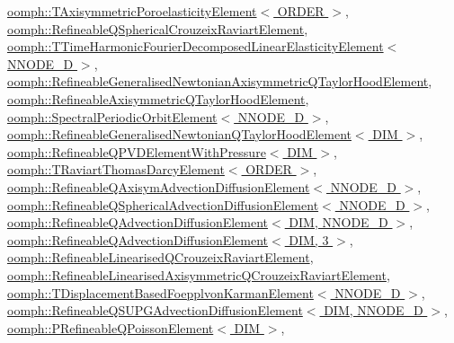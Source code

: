 \hyperlink{classoomph_1_1TAxisymmetricPoroelasticityElement_a0ca2892eb086103a351bcd202f10f98d}{oomph\+::\+T\+Axisymmetric\+Poroelasticity\+Element$<$ O\+R\+D\+E\+R $>$}, \hyperlink{classoomph_1_1RefineableQSphericalCrouzeixRaviartElement_a9784f4a6c9cc49169b0089b85373c434}{oomph\+::\+Refineable\+Q\+Spherical\+Crouzeix\+Raviart\+Element}, \hyperlink{classoomph_1_1TTimeHarmonicFourierDecomposedLinearElasticityElement_a57870ab2c9c506070441d8a428820d27}{oomph\+::\+T\+Time\+Harmonic\+Fourier\+Decomposed\+Linear\+Elasticity\+Element$<$ N\+N\+O\+D\+E\+\_\+D $>$}, \hyperlink{classoomph_1_1RefineableGeneralisedNewtonianAxisymmetricQTaylorHoodElement_a1594c3bbdfef0d1f34eb14e3da69082b}{oomph\+::\+Refineable\+Generalised\+Newtonian\+Axisymmetric\+Q\+Taylor\+Hood\+Element}, \hyperlink{classoomph_1_1RefineableAxisymmetricQTaylorHoodElement_ae60cce9a7c941a9e82ef31d1da23908b}{oomph\+::\+Refineable\+Axisymmetric\+Q\+Taylor\+Hood\+Element}, \hyperlink{classoomph_1_1SpectralPeriodicOrbitElement_a3ec38d16dfb22d1e7090b230db3479d5}{oomph\+::\+Spectral\+Periodic\+Orbit\+Element$<$ N\+N\+O\+D\+E\+\_\+D $>$}, \hyperlink{classoomph_1_1RefineableGeneralisedNewtonianQTaylorHoodElement_a23fd2cabf9e407ed4d134f9af2208a70}{oomph\+::\+Refineable\+Generalised\+Newtonian\+Q\+Taylor\+Hood\+Element$<$ D\+I\+M $>$}, \hyperlink{classoomph_1_1RefineableQPVDElementWithPressure_a89f62fc2fdb02ee78f36eef6b7d2f434}{oomph\+::\+Refineable\+Q\+P\+V\+D\+Element\+With\+Pressure$<$ D\+I\+M $>$}, \hyperlink{classoomph_1_1TRaviartThomasDarcyElement_a37259bdb01f2dc45d6bf26976e6e1cfd}{oomph\+::\+T\+Raviart\+Thomas\+Darcy\+Element$<$ O\+R\+D\+E\+R $>$}, \hyperlink{classoomph_1_1RefineableQAxisymAdvectionDiffusionElement_a33f8787ec034fe65cd2b2bb00cfbf9dc}{oomph\+::\+Refineable\+Q\+Axisym\+Advection\+Diffusion\+Element$<$ N\+N\+O\+D\+E\+\_\+D $>$}, \hyperlink{classoomph_1_1RefineableQSphericalAdvectionDiffusionElement_afcf743949d8dfc8d67cdd980294e7840}{oomph\+::\+Refineable\+Q\+Spherical\+Advection\+Diffusion\+Element$<$ N\+N\+O\+D\+E\+\_\+D $>$}, \hyperlink{classoomph_1_1RefineableQAdvectionDiffusionElement_a158f8e02a8fc6b9a1c650b3e0f832041}{oomph\+::\+Refineable\+Q\+Advection\+Diffusion\+Element$<$ D\+I\+M, N\+N\+O\+D\+E\+\_\+D $>$}, \hyperlink{classoomph_1_1RefineableQAdvectionDiffusionElement_a158f8e02a8fc6b9a1c650b3e0f832041}{oomph\+::\+Refineable\+Q\+Advection\+Diffusion\+Element$<$ D\+I\+M, 3 $>$}, \hyperlink{classoomph_1_1RefineableLinearisedQCrouzeixRaviartElement_a7da80a8d7a9ef0955afd4c8df649e40f}{oomph\+::\+Refineable\+Linearised\+Q\+Crouzeix\+Raviart\+Element}, \hyperlink{classoomph_1_1RefineableLinearisedAxisymmetricQCrouzeixRaviartElement_a49c1a3a0ec108edf45d9b81c02807469}{oomph\+::\+Refineable\+Linearised\+Axisymmetric\+Q\+Crouzeix\+Raviart\+Element}, \hyperlink{classoomph_1_1TDisplacementBasedFoepplvonKarmanElement_a8d0654116b55993bf68b640f74d4e4a4}{oomph\+::\+T\+Displacement\+Based\+Foepplvon\+Karman\+Element$<$ N\+N\+O\+D\+E\+\_\+D $>$}, \hyperlink{classoomph_1_1RefineableQSUPGAdvectionDiffusionElement_a7cd6f311a712fba0bf53a148cd737d1b}{oomph\+::\+Refineable\+Q\+S\+U\+P\+G\+Advection\+Diffusion\+Element$<$ D\+I\+M, N\+N\+O\+D\+E\+\_\+D $>$}, \hyperlink{classoomph_1_1PRefineableQPoissonElement_a9640f654f06259a532a62a23ed5f3ac7}{oomph\+::\+P\+Refineable\+Q\+Poisson\+Element$<$ D\+I\+M $>$}, 